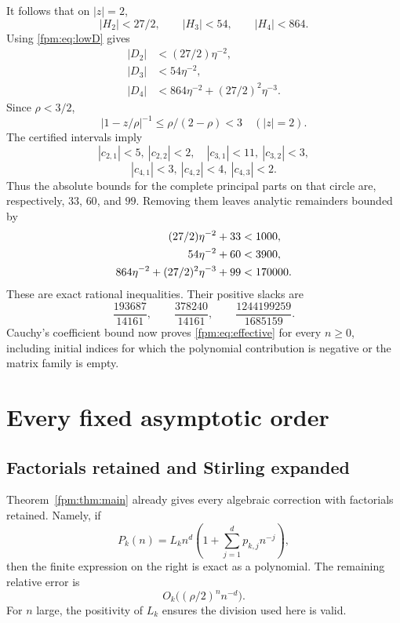 \documentclass[11pt]{article}
\theoremstyle{definition}\newtheorem{definition}[theorem]{Definition}
\theoremstyle{remark}\newtheorem{remark}[theorem]{Remark}
\begin{document}
It follows that on $|z|=2$,
\[
 |H_2|<27/2,\qquad |H_3|<54,\qquad |H_4|<864.
\]
Using \eqref{fpm:eq:lowD} gives
\begin{align*}
 |D_2|&<(27/2)\eta^{-2},\\
 |D_3|&<54\eta^{-2},\\
 |D_4|&<864\eta^{-2}+(27/2)^2\eta^{-3}.
\end{align*}
Since $\rho<3/2$,
\[
 |1-z/\rho|^{-1}\le\rho/(2-\rho)<3
 \quad (|z|=2).
\]
The certified intervals imply
\[
 |c_{2,1}|<5,\ |c_{2,2}|<2,\quad
 |c_{3,1}|<11,\ |c_{3,2}|<3,
\]
\[
 |c_{4,1}|<3,\ |c_{4,2}|<4,\ |c_{4,3}|<2.
\]
Thus the absolute bounds for the complete principal parts on that circle are, respectively, $33$, $60$, and $99$. Removing them leaves analytic remainders bounded by
\begin{align}
 (27/2)\eta^{-2}+33&<1000,\notag\\
 54\eta^{-2}+60&<3900,\label{fpm:eq:Mproof}\\
 864\eta^{-2}+(27/2)^2\eta^{-3}+99&<170000.\notag
\end{align}
These are exact rational inequalities. Their positive slacks are
\[
 \frac{193687}{14161},\qquad
 \frac{378240}{14161},\qquad
 \frac{1244199259}{1685159}.
\]
Cauchy's coefficient bound now proves \eqref{fpm:eq:effective} for every $n\ge0$, including initial indices for which the polynomial contribution is negative or the matrix family is empty.

\section{Every fixed asymptotic order}\label{fpm:sec:allorders}
\subsection{Factorials retained and Stirling expanded}
Theorem~\ref{fpm:thm:main} already gives every algebraic correction with factorials retained. Namely, if
\[
 P_k(n)=L_kn^d\left(1+\sum_{j=1}^d p_{k,j}n^{-j}\right),
\]
then the finite expression on the right is exact as a polynomial. The remaining relative error is
\begin{equation}\label{fpm:eq:relerror}
 O_k\bigl((\rho/2)^n n^{-d}\bigr).
\end{equation}
For $n$ large, the positivity of $L_k$ ensures the division used here is valid.
\end{document}
